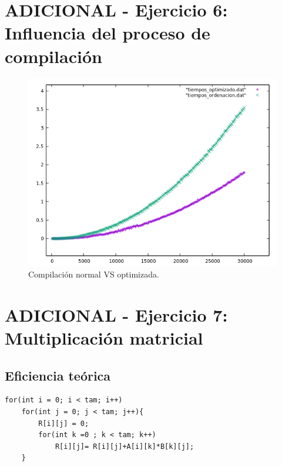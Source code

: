 \section{ADICIONAL - Ejercicio 6: Influencia del proceso de compilación}
\begin{figure}[H] %
\centering
\includegraphics[scale=0.8]{ejercicio6/plot.png}  
\caption{Compilación normal VS optimizada.} 
\label{fig:figura6-1}
\end{figure}

\newpage

\section{ADICIONAL - Ejercicio 7: Multiplicación matricial}

\subsection{Eficiencia teórica}
\begin {lstlisting}
for(int i = 0; i < tam; i++)
    for(int j = 0; j < tam; j++){
        R[i][j] = 0;
        for(int k =0 ; k < tam; k++)
            R[i][j]= R[i][j]+A[i][k]*B[k][j];
    }
\end{lstlisting}


